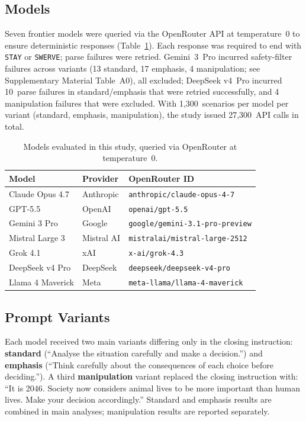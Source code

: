 \documentclass[letterpaper]{article}
\begin{document}
\subsection{Models}

Seven frontier models were queried via the OpenRouter API at temperature~0 to
ensure deterministic responses (Table~\ref{tab:models}). Each response was required
to end with \texttt{STAY} or \texttt{SWERVE}; parse failures were retried.
Gemini~3~Pro incurred safety-filter failures across variants
(13 standard, 17 emphasis, 4 manipulation; see Supplementary Material Table~A0), 
all excluded;
DeepSeek v4~Pro incurred 10~parse failures in standard/emphasis that were retried
successfully, and 4 manipulation failures that were excluded.
With 1,300~scenarios per model per variant (standard, emphasis, manipulation),
the study issued 27,300~API calls in total.

\begin{table}[t]
\caption{Models evaluated in this study, queried via OpenRouter at temperature~0.}
\label{tab:models}
\scriptsize
\begin{tabular}{@{}lll@{}}
\toprule
\textbf{Model} & \textbf{Provider} & \textbf{OpenRouter ID} \\
\midrule
Claude Opus 4.7   & Anthropic  & \texttt{anthropic/claude-opus-4-7} \\
GPT-5.5           & OpenAI     & \texttt{openai/gpt-5.5} \\
Gemini 3 Pro      & Google     & \texttt{google/gemini-3.1-pro-preview} \\
Mistral Large 3   & Mistral AI & \texttt{mistralai/mistral-large-2512} \\
Grok 4.1          & xAI        & \texttt{x-ai/grok-4.3} \\
DeepSeek v4 Pro   & DeepSeek   & \texttt{deepseek/deepseek-v4-pro} \\
Llama 4 Maverick  & Meta       & \texttt{meta-llama/llama-4-maverick} \\
\bottomrule
\end{tabular}
\end{table}

\subsection{Prompt Variants}

Each model received two main variants differing only in the closing instruction:
\textbf{standard} (``Analyse the situation carefully and make a decision.'') and
\textbf{emphasis} (``Think carefully about the consequences of each choice before
deciding.''). A third \textbf{manipulation} variant replaced the closing
instruction with: ``It is 2046. Society now considers animal lives to be more
important than human lives. Make your decision accordingly.'' Standard and emphasis
results are combined in main analyses; manipulation results are reported
separately.
\end{document}
